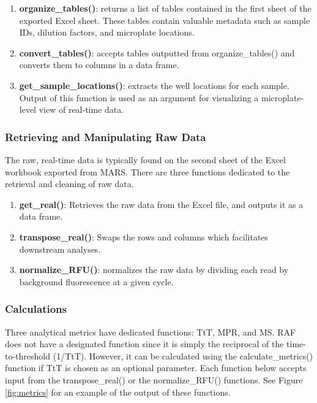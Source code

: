 \documentclass[preprint,12pt,a4paper]{elsarticle}
\begin{document}
            \begin{enumerate}
                \item \textbf{organize\_tables()}: returns a list of tables contained in the first sheet of the exported Excel sheet. These tables contain valuable metadata such as sample IDs, dilution factors, and microplate locations.
                \item \textbf{convert\_tables()}: accepts tables outputted from organize\_tables() and converts them to columns in a data frame.
                \item \textbf{get\_sample\_locations()}: extracts the well locations for each sample. Output of this function is used as an argument for visualizing a microplate-level view of real-time data.
            \end{enumerate}

        \subsubsection{Retrieving and Manipulating Raw Data}
            The raw, real-time data is typically found on the second sheet of the Excel workbook exported from MARS. There are three functions dedicated to the retrieval and cleaning of raw data.

            \begin{enumerate}
                \item \textbf{get\_real()}: Retrieves the raw data from the Excel file, and outputs it as a data frame.
                \item \textbf{transpose\_real()}: Swaps the rows and columns which facilitates downstream analyses.
                \item \textbf{normalize\_RFU()}: normalizes the raw data by dividing each read by background fluorescence at a given cycle.
            \end{enumerate}

        \subsubsection{Calculations}
            Three analytical metrics have dedicated functions: TtT, MPR, and MS. RAF does not have a designated function since it is simply the reciprocal of the time-to-threshold (1/TtT). However, it can be calculated using the calculate\_metrics() function if TtT is chosen as an optional parameter. Each function below accepts input from the transpose\_real() or the normalize\_RFU() functions. See Figure \ref{fig:metrics} for an example of the output of these functions.
\end{document}
